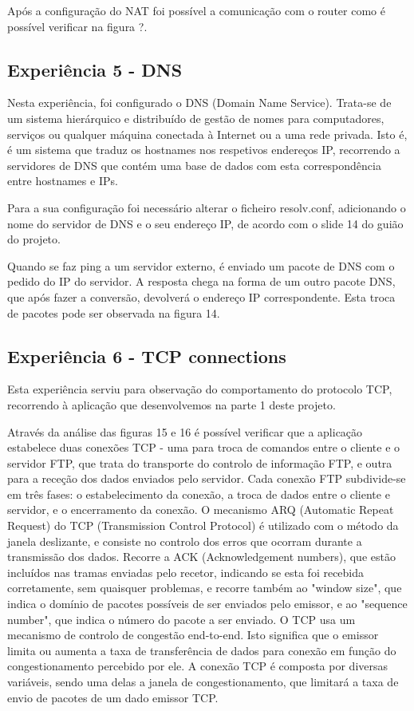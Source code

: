 \documentclass[article, a4paper, 11pt, oneside]{memoir}
\begin{document}
Após a configuração do NAT foi possível a comunicação com o router como é possível verificar na figura ?.

\subsection{Experiência 5 - DNS}			

Nesta experiência, foi configurado o DNS (Domain Name Service). Trata-se de um sistema hierárquico e distribuído de gestão de nomes para computadores, serviços ou qualquer máquina conectada à
 Internet ou a uma rede privada.
Isto é, é um sistema que traduz os hostnames nos respetivos endereços IP, 
recorrendo a servidores de DNS que contém uma base de dados com esta correspondência entre hostnames e IPs.

Para a sua configuração foi necessário alterar o ficheiro resolv.conf, adicionando o nome do servidor de DNS e o seu endereço IP, de acordo com o slide 14 do guião do projeto.

Quando se faz ping a um servidor externo, é enviado um pacote de DNS com o pedido do IP do servidor. A resposta chega na forma de um outro pacote DNS, que após fazer a conversão, 
devolverá o endereço IP correspondente.
Esta troca de pacotes pode ser observada na figura 14.

\subsection{Experiência 6 - TCP connections}

Esta experiência serviu para observação do comportamento do protocolo TCP, 
recorrendo à aplicação que desenvolvemos na parte 1 deste projeto. 

Através da análise das figuras 15 e 16 é possível verificar que a aplicação estabelece duas conexões TCP - uma para troca de comandos entre o cliente e o servidor FTP, 
que trata do transporte do controlo de informação FTP, e outra para a receção dos dados enviados pelo servidor.
Cada conexão FTP subdivide-se em três fases: o estabelecimento da conexão, a troca de dados entre o cliente e servidor, e o encerramento da conexão.
O mecanismo ARQ (Automatic Repeat Request) do TCP (Transmission Control Protocol) é utilizado com o método da janela deslizante, e consiste no controlo dos erros que ocorram durante a transmissão dos dados.
Recorre a ACK (Acknowledgement numbers), que estão incluídos nas tramas enviadas pelo recetor, indicando se esta foi recebida corretamente, sem quaisquer problemas, e recorre também ao "window size", que indica o domínio de pacotes possíveis de ser enviados pelo emissor, e ao "sequence number", que indica o número do pacote a ser enviado.
O TCP usa um mecanismo de controlo de congestão end-to-end. Isto significa que o emissor limita ou aumenta a taxa de transferência de dados para conexão em função do congestionamento percebido por ele.
A conexão TCP é composta por diversas variáveis, sendo uma delas a janela de congestionamento, que limitará a taxa de envio de pacotes de um dado emissor TCP.
\end{document}
